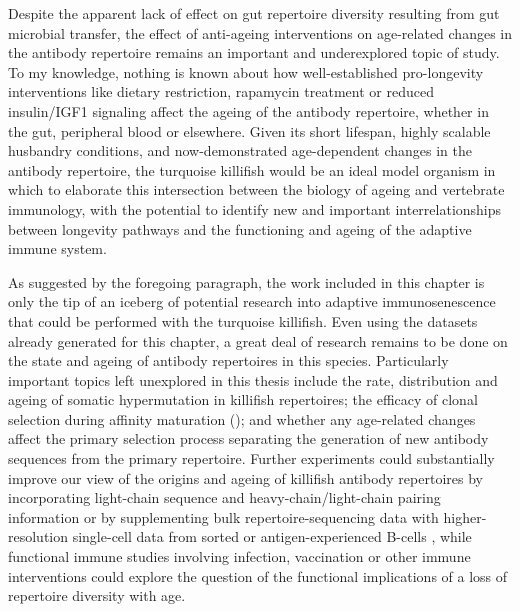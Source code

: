 Despite the apparent lack of effect on gut repertoire diversity resulting from gut microbial transfer, the effect of anti-ageing interventions on age-related changes in the antibody repertoire remains an important and underexplored topic of study. To my knowledge, nothing is known about how well-established pro-longevity interventions like dietary restriction, rapamycin treatment or reduced insulin/IGF1 signaling \parencite{lopezotin2013hallmarks} affect the ageing of the antibody repertoire, whether in the gut, peripheral blood or elsewhere. Given its short lifespan, highly scalable husbandry conditions, and now-demonstrated age-dependent changes in the antibody repertoire, the turquoise killifish would be an ideal model organism in which to elaborate this intersection between the biology of ageing and vertebrate immunology, with the potential to identify new and important interrelationships between longevity pathways and the functioning and ageing of the adaptive immune system.

As suggested by the foregoing paragraph, the work included in this chapter is only the tip of an iceberg of potential research into adaptive immunosenescence that could be performed with the turquoise killifish. Even using the datasets already generated for this chapter, a great deal of research remains to be done on the state and ageing of antibody repertoires in this species. Particularly important topics left unexplored in this thesis include the rate, distribution and ageing of somatic hypermutation in killifish repertoires; the efficacy of clonal selection during affinity maturation (); and whether any age-related changes affect the primary selection process separating the generation of new antibody sequences from the primary \naive repertoire. Further experiments could substantially improve our view of the origins and ageing of killifish antibody repertoires by incorporating light-chain sequence and heavy-chain/light-chain pairing information or by supplementing bulk repertoire-sequencing data with higher-resolution single-cell data from sorted \naive or antigen-experienced B-cells \parencite{friedensohn2017advanced}, while functional immune studies involving infection, vaccination or other immune interventions could explore the question of the functional implications of a loss of repertoire diversity with age.

